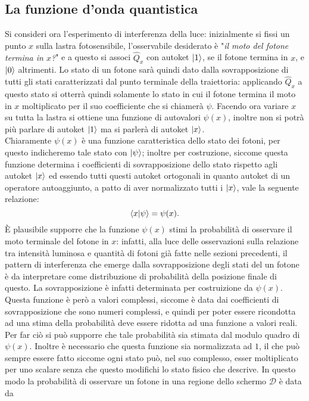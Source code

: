 \subsection{La funzione d'onda quantistica}
Si consideri ora l'esperimento di interferenza della luce: inizialmente si fissi un punto $x$ sulla lastra fotosensibile, l'osservabile desiderato è "\emph{il moto del fotone termina in $x$?}" e a questo si associ $\hat Q_x$ con autoket $\ket{1}$, se il fotone termina in $x$, e $\ket{0}$ altrimenti. Lo stato di un fotone sarà quindi dato dalla sovrapposizione di tutti gli stati caratterizzati dal punto terminale della traiettoria: applicando $\hat Q_x$ a questo stato si otterrà quindi solamente lo stato in cui il fotone termina il moto in $x$ moltiplicato per il suo coefficiente che si chiamerà $\psi$. Facendo ora variare $x$ su tutta la lastra si ottiene una funzione di autovalori $\psi(x)$, inoltre non si potrà più parlare di autoket $\ket{1}$ ma si parlerà di autoket $\ket{x}$.\\
Chiaramente $\psi(x)$ è una funzione caratteristica dello stato dei fotoni, per questo indicheremo tale stato con $\ket{\psi}$; inoltre per costruzione, siccome questa funzione determina i coefficienti di sovrapposizione dello stato rispetto agli autoket $\ket{x}$ ed essendo tutti questi autoket ortogonali in quanto autoket di un operatore autoaggiunto, a patto di aver normalizzato tutti i $\ket{x}$, vale la seguente relazione:
\begin{equation}
    \braket{x|\psi}=\psi(x).
\end{equation} 
È plausibile supporre che la funzione $\psi(x)$ stimi la probabilità di osservare il moto terminale del fotone in $x$: infatti, alla luce delle osservazioni sulla relazione tra intensità luminosa e quantità di fotoni già fatte nelle sezioni precedenti, il pattern di interferenza che emerge dalla sovrapposizione degli stati del un fotone è da interpretare come distribuzione di probabilità della posizione finale di questo. La sovrapposizione è infatti determinata per costruizione da $\psi(x)$. Questa funzione è però a valori complessi, siccome è data dai coefficienti di sovrapposizione che sono numeri complessi, e quindi per poter essere ricondotta ad una stima della probabilità deve essere ridotta ad una funzione a valori reali. Per far ciò si può supporre che tale probabilità sia stimata dal modulo quadro di $\psi(x)$. Inoltre è necessario che questa funzione sia normalizzata ad $1$, il che può sempre essere fatto siccome ogni stato può, nel suo complesso, esser moltiplicato per uno scalare senza che questo modifichi lo stato fisico che descrive. In questo modo la probabilità di osservare un fotone in una regione dello schermo $\mathcal{D}$ è data da 
